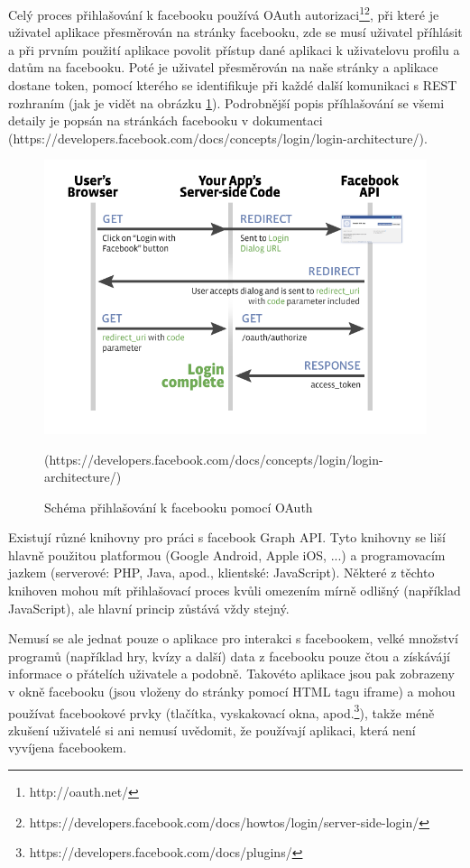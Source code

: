 \documentclass[thesis=M,czech]{FITthesis}[2013/05/10]
\begin{document}
Celý proces přihlašování k facebooku používá OAuth autorizaci\footnote{http://oauth.net/}\footnote{https://developers.facebook.com/docs/howtos/login/server-side-login/}, při které je uživatel aplikace přesměrován na stránky facebooku, zde se musí uživatel příhlásit a při prvním použití aplikace povolit přístup dané aplikaci k uživatelovu profilu a datům na facebooku. Poté je uživatel přesměrován na naše stránky a aplikace dostane token, pomocí kterého se identifikuje při každé další komunikaci s REST rozhraním  (jak je vidět na obrázku \ref{fig:oAuthDiagram}). Podrobnější popis příhlašování se všemi detaily je popsán na stránkách facebooku v dokumentaci \newline(https://developers.facebook.com/docs/concepts/login/login-architecture/). 

\begin{figure}[h]
\begin{center}
\includegraphics[width=5in]{figures/server-side-diagram.png}
\caption{Schéma přihlašování k facebooku pomocí OAuth}
(https://developers.facebook.com/docs/concepts/login/login-architecture/)
\label{fig:oAuthDiagram}
\end{center}
\end{figure}

Existují různé knihovny pro práci s facebook Graph API. Tyto knihovny se liší hlavně použitou platformou (Google Android, Apple iOS, ...) a programovacím jazkem (serverové: PHP, Java, apod., klientské: JavaScript). Některé z těchto knihoven mohou mít přihlašovací proces kvůli omezením mírně odlišný (například JavaScript), ale hlavní princip zůstává vždy stejný.

Nemusí se ale jednat pouze o aplikace pro interakci s facebookem, velké množství programů (například hry, kvízy a další) data z facebooku pouze čtou a získávájí informace o přátelích uživatele a podobně. Takovéto aplikace jsou pak zobrazeny v okně facebooku (jsou vloženy do stránky pomocí HTML tagu iframe) a mohou používat facebookové prvky (tlačítka, vyskakovací okna, apod.\footnote{https://developers.facebook.com/docs/plugins/}), takže méně zkušení uživatelé si ani nemusí uvědomit, že používají aplikaci, která není vyvíjena facebookem. 
\end{document}
